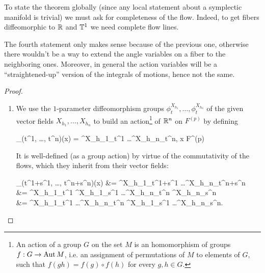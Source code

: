 \documentclass[main.tex]{subfiles}
\begin{document}
\begin{remark}
	To state the theorem globally (since any local statement about a symplectic manifold is trivial) we must ask for completeness of the flow. Indeed, to get fibers diffeomorphic to $\mathbb{R}$ and $\mathbb{T}^1$ we need complete flow lines.
\end{remark}
\begin{remark}
	The fourth statement only makes sense because of the previous one, otherwise there wouldn't be a way to extend the angle variables on a fiber to the neighboring ones. Moreover, in general the action variables will be a ``straightened-up'' version of the integrals of motions, hence not the same.
\end{remark}
\begin{proof}
	\leavevmode
	\begin{enumerate}
		\item We use the $1$-parameter diffeomorphism groups $\phi^{X_{h_1}}_t, \ldots, \phi^{X_{h_n}}_t$ of the given vector fields $X_{h_1}, \ldots, X_{h_n}$ to build an action\footnote{An action of a group $G$ on the set $M$ is an homomorphism of groups $f:G \to \operatorname{Aut} M$, i.e. an assignment of permutations of $M$ to elements of $G$, such that $f(gh) = f(g) \circ f(h)$ for every $g,h \in G$.} of $\mathbb{R}^n$ on $F^{(p)}$ by defining
		\begin{eqalign}
			\phi_{(t^1, \ldots, t^n)}(x) = \phi^{X_{h_1}}_{t^1} \circ \ldots \circ \phi^{X_{h_n}}_{t^n}, \quad \forall x \in F^{(p)}
		\end{eqalign}
		It is well-defined (as a group action) by virtue of the commutativity of the flows, which they inherit from their vector fields:
		\begin{eqalign}
			\phi_{(t^1+s^1, \ldots, t^n+s^n)}(x) &= \phi^{X_{h_1}}_{t^1+s^1} \circ \ldots \circ \phi^{X_{h_n}}_{t^n+s^n}\\
			&= \phi^{X_{h_1}}_{t^1} \circ \phi^{X_{h_1}}_{s^1} \circ \ldots \circ \phi^{X_{h_n}}_{t^n} \circ \phi^{X_{h_n}}_{s^n}\\
			&= \phi^{X_{h_1}}_{t^1} \circ \ldots \circ \phi^{X_{h_n}}_{t^n} \circ \phi^{X_{h_1}}_{s^1} \circ \ldots \circ \phi^{X_{h_n}}_{s^n}.
		\end{eqalign}

\end{enumerate}
\end{proof}
\end{document}
